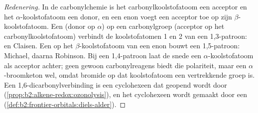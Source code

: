 \begin{proof}[Redenering]
In de carbonylchemie is het carbonylkoolstofatoom een acceptor en het $\alpha$-koolstofatoom een donor, en een enon
voegt een acceptor toe op zijn $\beta$-koolstofatoom. Een  (donor op $\alpha$) op een carbonylgroep (acceptor op het
carbonylkoolstofatoom) verbindt de koolstofatomen 1 en 2 van een 1,3-patroon:  en Claisen. Een  op het $\beta$-koolstofatoom
van een enon bouwt een 1,5-patroon: Michael, daarna Robinson. Bij een 1,4-patroon laat de snede een
$\alpha$-koolstofatoom als acceptor achter; geen gewoon carbonylreagens biedt die polariteit, maar een
$\alpha$-broomketon wel, omdat bromide op dat koolstofatoom een vertrekkende groep is. Een 1,6-dicarbonylverbinding is een cyclohexeen dat geopend wordt
door  (\cref{prop:b2:alkene-redox:ozonolysis}), en het cyclohexeen wordt gemaakt door een
 (\cref{def:b2:frontier-orbitals:diels-alder}).
\end{proof}

